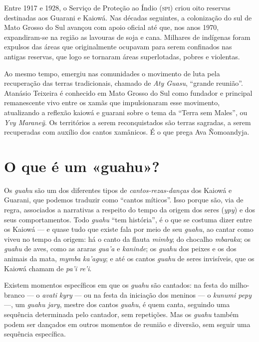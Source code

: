 Entre 1917 e 1928, o Serviço de Proteção ao Índio (\textsc{spi}) criou oito
reservas destinadas aos Guarani e Kaiowá. Nas décadas seguintes, a
colonização do sul de Mato Grosso do Sul avançou com apoio oficial até
que, nos anos 1970, expandiram-se na região as lavouras de soja e cana.
Milhares de indígenas foram expulsos das áreas que originalmente ocupavam
para serem confinados nas antigas reservas, que logo se tornaram áreas
superlotadas, pobres e violentas.

Ao mesmo tempo, emergiu nas comunidades o movimento de luta pela
recuperação das terras tradicionais, chamado de \textit{Aty Guasu}, ``grande
reunião''. Atanásio Teixeira é conhecido em Mato Grosso do Sul como
fundador e principal remanescente vivo entre os xamãs que impulsionaram
esse movimento, atualizando a reflexão kaiowá e guarani sobre o tema da
``Terra sem Males'', ou \textit{Yvy Maraneỹ}. Os territórios a serem
reconquistados são terras sagradas, a serem recuperadas com auxílio dos
cantos xamânicos. É o que prega Ava Ñomoandyja.

\section{O que é um «guahu»?}

Os \textit{guahu} são um dos diferentes tipos de \textit{cantos-rezas-danças} dos
Kaiowá e Guarani, que podemos traduzir como ``cantos míticos''. Isso porque são, via de regra, associados a
narrativas a respeito do tempo da origem dos seres (\textit{ypy}) e dos
seus comportamentos. Todo \textit{guahu} ``tem história'', é o que se
costuma dizer entre os Kaiowá --- e quase tudo que existe fala por meio de
seu \textit{guahu}, ao cantar como viveu no tempo da origem: há o canto da
flauta \textit{mimby}; do chocalho \textit{mbaraka}; os \textit{guahu} de
aves, como as araras \textit{gua'a} e \textit{kaninde}; os \textit{guahu} dos
peixes e os dos animais da mata, \textit{mymba ka'aguy}; e até os cantos
\textit{guahu} de seres invisíveis, que os Kaiowá chamam de \textit{pa'i
re'i}.

Existem momentos específicos em que os \textit{guahu} são cantados: na
festa do milho-branco --- o \textit{avati kyry} --- ou na festa da iniciação
dos meninos --- o \textit{kunumi pepy} ---, um \textit{guahu jary}, mestre dos
cantos \textit{guahu}, é quem canta, seguindo uma sequência determinada
pelo cantador, sem repetições. Mas os \textit{guahu} também podem ser
dançados em outros momentos de reunião e diversão, sem seguir uma
sequência específica.

